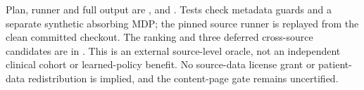 Plan, runner and full output are ,  and . Tests check metadata guards and a separate synthetic absorbing MDP; the pinned source runner is replayed from the clean committed checkout. The ranking and three deferred cross-source candidates are in . This is an external source-level oracle, not an independent clinical cohort or learned-policy benefit. No source-data license grant or patient-data redistribution is implied, and the content-page gate remains uncertified.




